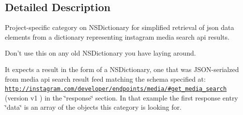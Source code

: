 \subsection{Detailed Description}
Project-\/specific category on N\-S\-Dictionary for simplified retrieval of json data elements from a dictionary representing instagram media search api results.

Don't use this on any old N\-S\-Dictionary you have laying around.

It expects a result in the form of a N\-S\-Dictionary, one that was J\-S\-O\-N-\/serialzed from media api search result feed matching the schema specified at\-: \href{http://instagram.com/developer/endpoints/media/#get_media_search}{\tt http\-://instagram.\-com/developer/endpoints/media/\#get\-\_\-media\-\_\-search} (version v1 ) in the \char`\"{}response\char`\"{} section. In that example the first response entry \char`\"{}data\char`\"{} is an array of the objects this category is looking for. 

